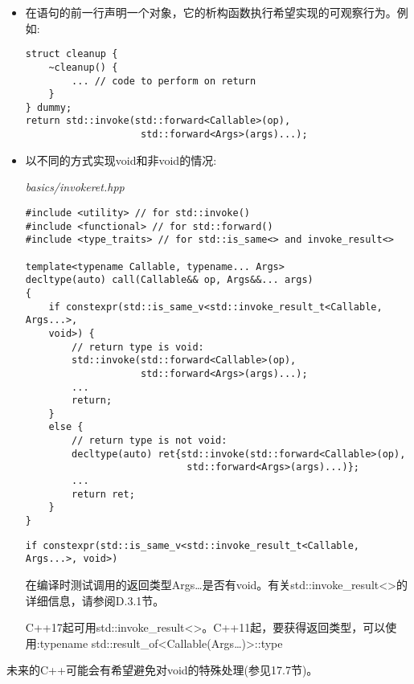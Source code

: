 \begin{itemize}
\item 
在语句的前一行声明一个对象，它的析构函数执行希望实现的可观察行为。例如:

\begin{lstlisting}[style=styleCXX]
struct cleanup {
	~cleanup() {
		... // code to perform on return
	}
} dummy;
return std::invoke(std::forward<Callable>(op),
					std::forward<Args>(args)...);
\end{lstlisting}

\item 
以不同的方式实现void和非void的情况:

\noindent
\textit{basics/invokeret.hpp}
\begin{lstlisting}[style=styleCXX]
#include <utility> // for std::invoke()
#include <functional> // for std::forward()
#include <type_traits> // for std::is_same<> and invoke_result<>

template<typename Callable, typename... Args>
decltype(auto) call(Callable&& op, Args&&... args)
{
	if constexpr(std::is_same_v<std::invoke_result_t<Callable, Args...>,
	void>) {
		// return type is void:
		std::invoke(std::forward<Callable>(op),
					std::forward<Args>(args)...);
		...
		return;
	}
	else {
		// return type is not void:
		decltype(auto) ret{std::invoke(std::forward<Callable>(op),
							std::forward<Args>(args)...)};
		...
		return ret;
	}
}
\end{lstlisting}

\begin{lstlisting}[style=styleCXX]
if constexpr(std::is_same_v<std::invoke_result_t<Callable, Args...>, void>)
\end{lstlisting}

在编译时测试调用的返回类型Args…是否有void。有关std::invoke\_result<>的详细信息，请参阅D.3.1节。

\begin{tcolorbox}[colback=webgreen!5!white,colframe=webgreen!75!black]
\hspace*{0.75cm}C++17起可用std::invoke\_result<>。C++11起，要获得返回类型，可以使用:typename std::result\_of<Callable(Args…)>::type
\end{tcolorbox}

\end{itemize}

未来的C++可能会有希望避免对void的特殊处理(参见17.7节)。












